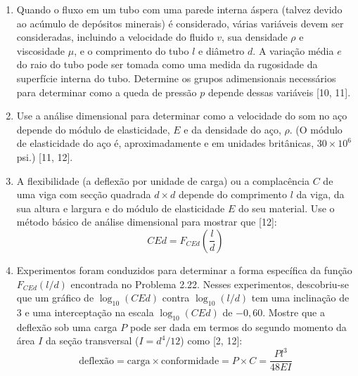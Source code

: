 \begin{enumerate}
    \item[\textbf{Problema 2.20.}] Quando o fluxo em um tubo com uma parede interna áspera (talvez devido ao acúmulo de depósitos minerais) é considerado, várias variáveis devem ser consideradas, incluindo a velocidade do fluido $v$, sua densidade $\rho$ e viscosidade $\mu$, e o comprimento do tubo $l$ e diâmetro $d$. A variação média $e$ do raio do tubo pode ser tomada como uma medida da rugosidade da superfície interna do tubo. Determine os grupos adimensionais necessários para determinar como a queda de pressão $p$ depende dessas variáveis [10, 11].

    \item[\textbf{Problema 2.21.}] Use a análise dimensional para determinar como a velocidade do som no aço depende do módulo de elasticidade, $E$ e da densidade do aço, $\rho$. (O módulo de elasticidade do aço é, aproximadamente e em unidades britânicas, $30 \times 10^6$ psi.) [11, 12].

    \item[\textbf{Problema 2.22.}] A flexibilidade (a deflexão por unidade de carga) ou a complacência $C$ de uma viga com secção quadrada $d \times d$ depende do comprimento $l$ da viga, da sua altura e largura e do módulo de elasticidade $E$ do seu material. Use o método básico de análise dimensional para mostrar que [12]:
    \begin{equation}
        CEd = F_{CEd}\left(\frac{l}{d}\right)
    \end{equation}

    \item[\textbf{Problema 2.23.}] Experimentos foram conduzidos para determinar a forma específica da função $F_{CEd}(l/d)$ encontrada no Problema 2.22. Nesses experimentos, descobriu-se que um gráfico de $\log_{10} (CEd)$ contra $\log_{10} (l / d)$ tem uma inclinação de $3$ e uma interceptação na escala $\log_{10} (CEd)$ de $-0,60$. Mostre que a deflexão sob uma carga $P$ pode ser dada em termos do segundo momento da área $I$ da seção transversal ($I = d^4/12$) como [2, 12]:
    \begin{equation}
        \text{deflexão} = \text{carga} \times \text{conformidade} = P \times C = \frac{Pl^3}{48EI}
    \end{equation}

\end{enumerate}